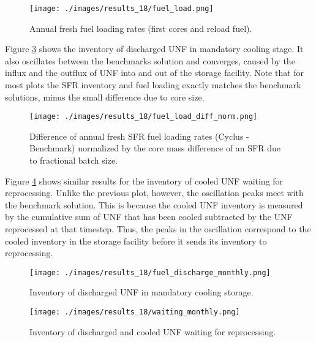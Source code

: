 \begin{figure}[htbp!]
    \begin{center}
        \texttt{[image: ./images/results\_18/fuel\_load.png]}
    \end{center}
        \caption{Annual fresh fuel loading rates (first cores and reload fuel).}
    \label{fig:fuel_load}
\end{figure}

Figure \ref{fig:fuel_discharge_monthly} shows the inventory of discharged
\gls{UNF} in mandatory cooling stage. It also oscillates between the benchmarks
solution and converges, caused by the influx and the outflux of \gls{UNF}
into and out of the storage facility.
Note that for most plots the \gls{SFR} inventory and fuel loading
exactly matches the benchmark solutions, minus the small difference due to core
size.

\begin{figure}[htbp!]
    \begin{center}
        \texttt{[image: ./images/results\_18/fuel\_load\_diff\_norm.png]}
    \end{center}
        \caption{Difference of annual fresh \gls{SFR} fuel loading rates (Cyclus - Benchmark) normalized by the core mass difference of an \gls{SFR} due to fractional batch size.}
    \label{fig:fuel_load_diff_norm}
\end{figure}


Figure \ref{fig:waiting_monthly} shows similar results for the inventory of cooled
\gls{UNF} waiting for reprocessing.
Unlike the previous plot, however, the oscillation peaks meet with the benchmark
solution.  This is because the cooled \gls{UNF} inventory is measured by the cumulative sum
of \gls{UNF} that has been cooled subtracted by the \gls{UNF} reprocessed at that timestep.
Thus, the peaks in the oscillation correspond to the cooled inventory in the storage
facility before it sends its inventory to reprocessing.

\begin{figure}[htbp!]
    \begin{center}
        \texttt{[image: ./images/results\_18/fuel\_discharge\_monthly.png]}
    \end{center}
        \caption{Inventory of discharged \gls{UNF} in mandatory cooling storage.}
    \label{fig:fuel_discharge_monthly}
\end{figure}


\begin{figure}[htbp!]
    \begin{center}
        \texttt{[image: ./images/results\_18/waiting\_monthly.png]}
    \end{center}
        \caption{Inventory of discharged and cooled \gls{UNF} waiting for reprocessing.}
    \label{fig:waiting_monthly}
\end{figure}


